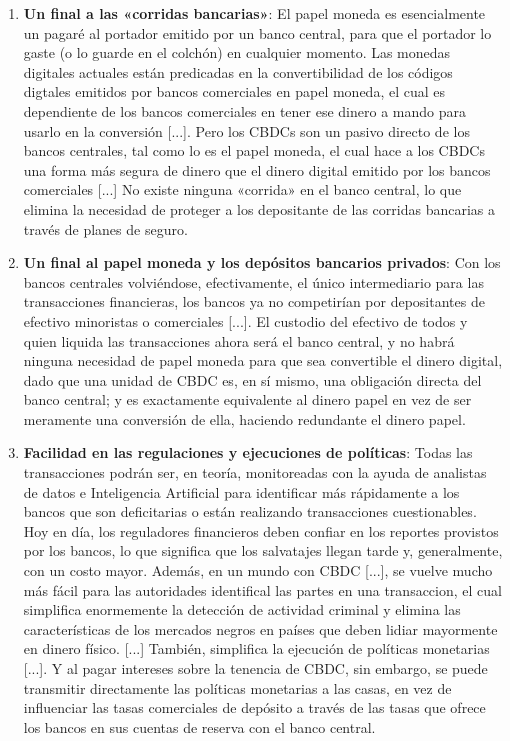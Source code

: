\documentclass[12pt,a4paper,twoside]{book}
\begin{document}
\begin{enumerate}
\item \textbf{Un final a las «corridas bancarias»}: El papel moneda es esencialmente un pagaré al portador emitido por un banco central, para que el portador lo gaste (o lo guarde en el colchón) en cualquier momento. Las monedas digitales actuales están predicadas en la convertibilidad de los códigos digtales emitidos por bancos comerciales en papel moneda, el cual es dependiente de los bancos comerciales en tener ese dinero a mando para usarlo en la conversión [...]. Pero los CBDCs son un pasivo directo de los bancos centrales, tal como lo es el papel moneda, el cual hace a los CBDCs una forma más segura de dinero que el dinero digital emitido por los bancos comerciales [...] No existe ninguna «corrida» en el banco central, lo que elimina la necesidad de proteger a los depositante de las corridas bancarias a través de planes de seguro.
\item \textbf{Un final al papel moneda y los depósitos bancarios privados}: Con los bancos centrales volviéndose, efectivamente, el único intermediario para las transacciones financieras, los bancos ya no competirían por depositantes de efectivo minoristas o comerciales [...]. El custodio del efectivo de todos y quien liquida las transacciones ahora será el banco central, y no habrá ninguna necesidad de papel moneda para que sea convertible el dinero digital, dado que una unidad de CBDC es, en sí mismo, una obligación directa del banco central; y es exactamente equivalente al dinero papel en vez de ser meramente una conversión de ella, haciendo redundante el dinero papel.
\item \textbf{Facilidad en las regulaciones y ejecuciones de políticas}: Todas las transacciones podrán ser, en teoría, monitoreadas con la ayuda de analistas de datos e Inteligencia Artificial para identificar más rápidamente a los bancos que son deficitarias o están realizando transacciones cuestionables. Hoy en día, los reguladores financieros deben confiar en los reportes provistos por los bancos, lo que significa que los salvatajes llegan tarde y, generalmente, con un costo mayor. Además, en un mundo con CBDC [...], se vuelve mucho más fácil para las autoridades identifical las partes en una transaccion, el cual simplifica enormemente la detección de actividad criminal y elimina las características de los mercados negros en países que deben lidiar mayormente en dinero físico. [...] También, simplifica la ejecución de políticas monetarias [...]. Y al pagar intereses sobre la tenencia de CBDC, sin embargo, se puede transmitir directamente las políticas monetarias a las casas, en vez de influenciar las tasas comerciales de depósito a través de las tasas que ofrece los bancos en sus cuentas de reserva con el banco central.

\end{enumerate}
\end{document}
